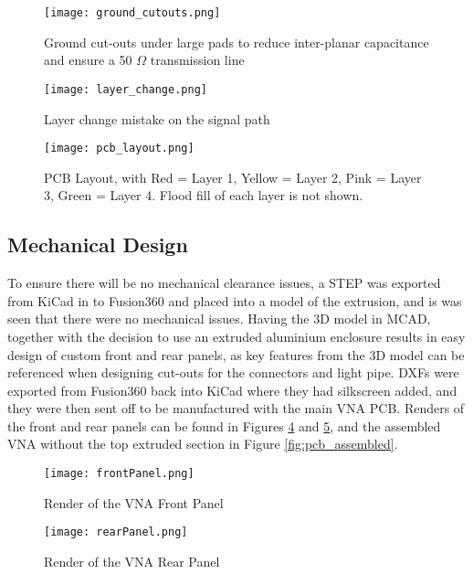 \begin{figure}[H]
	\centering
	\texttt{[image: ground\_cutouts.png]}
	\caption{Ground cut-outs under large pads to reduce inter-planar capacitance and ensure a 50 $\Omega$ transmission line}
	\label{fig:pcb_cap_comp}
\end{figure}

\begin{figure}[H]
	\centering
	\texttt{[image: layer\_change.png]}
	\caption{Layer change mistake on the signal path}
	\label{fig:pcb_layer_change}
\end{figure}

\begin{landscape}
	\begin{figure}
		\centering
		\texttt{[image: pcb\_layout.png]}
		\caption{PCB Layout, with Red = Layer 1, Yellow = Layer 2, Pink = Layer 3, Green = Layer 4. Flood fill of each layer is not shown.}
		\label{fig:pcb_layout}
	\end{figure}
\end{landscape}

\subsection{Mechanical Design}
To ensure there will be no mechanical clearance issues, a STEP was exported from KiCad in to Fusion360 and placed into a model of the extrusion, and is was seen that there were no mechanical issues. Having the 3D model in MCAD, together with the decision to use an extruded aluminium enclosure results in easy design of custom front and rear panels, as key features from the 3D model can be referenced when designing cut-outs for the connectors and light pipe. DXFs were exported from Fusion360 back into KiCad where they had silkscreen added, and they were then sent off to be manufactured with the main VNA PCB. Renders of the front and rear panels can be found in Figures \ref{fig:pcb_front_render} and \ref{fig:pcb_rear_render}, and the assembled VNA without the top extruded section in Figure \ref{fig:pcb_assembled}.

\begin{figure}[H]
	\centering
	\texttt{[image: frontPanel.png]}
	\caption{Render of the VNA Front Panel}
	\label{fig:pcb_front_render}
\end{figure}

\begin{figure}[H]
	\centering
	\texttt{[image: rearPanel.png]}
	\caption{Render of the VNA Rear Panel}
	\label{fig:pcb_rear_render}
\end{figure}

